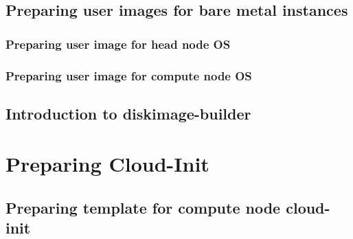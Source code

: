 \documentclass[letterpaper]{article}
\newcommand{\baseOS}{CentOS7.3}
\begin{document}
\subsection{Preparing user images for bare metal instances}\label{sec:bare_metal_user_images}


\subsubsection{Preparing user image for head node OS}\label{sec:head_node_images}


\subsubsection{Preparing user image for compute node OS}\label{sec:compute_node_images}


\subsection{Introduction to diskimage-builder}\label{sec:din_intro}


\clearpage

\section{Preparing Cloud-Init} \label{sec:cloud-init_prep}



\subsection{Preparing template for compute node cloud-init} \label{sec:c_i-template_compute_node}


\end{document}
